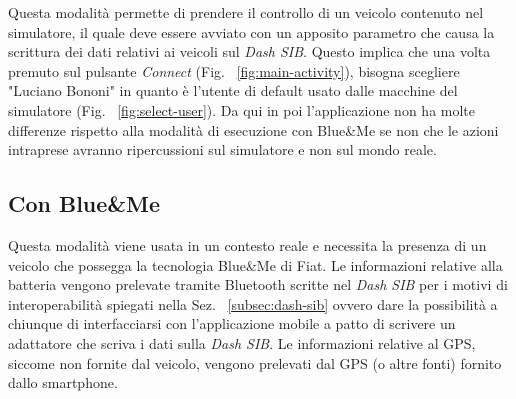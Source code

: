 Questa modalità permette di prendere il controllo di un veicolo contenuto nel simulatore, il quale deve essere avviato con un apposito parametro che causa la scrittura dei dati relativi ai veicoli sul \emph{Dash SIB}. Questo implica che una volta premuto sul pulsante \emph{Connect} (Fig. ~\ref{fig:main-activity}), bisogna scegliere "Luciano Bononi" in quanto è l'utente di default usato dalle macchine del simulatore (Fig. ~\ref{fig:select-user}). Da qui in poi l'applicazione non ha molte differenze rispetto alla modalità di esecuzione con Blue\&{}Me se non che le azioni intraprese avranno ripercussioni sul simulatore e non sul mondo reale.


\subsection{Con Blue\&{}Me}

Questa modalità viene usata in un contesto reale e necessita la presenza di un veicolo che possegga la tecnologia Blue\&{}Me di Fiat. Le informazioni relative alla batteria vengono prelevate tramite Bluetooth scritte nel \emph{Dash SIB} per i motivi di interoperabilità spiegati nella Sez. ~\ref{subsec:dash-sib} ovvero dare la possibilità a chiunque di interfacciarsi con l'applicazione mobile a patto di scrivere un adattatore che scriva i dati sulla \emph{Dash SIB}. Le informazioni relative al GPS, siccome non fornite dal veicolo, vengono prelevati dal GPS (o altre fonti) fornito dallo smartphone.

